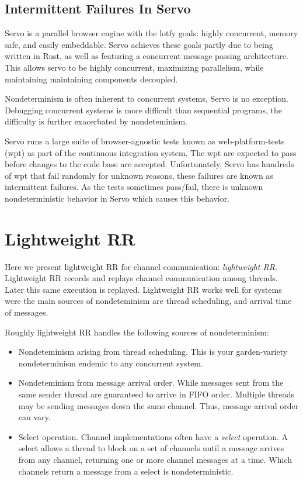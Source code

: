 \documentclass{article}
\begin{document}
\subsection{Intermittent Failures In Servo}
Servo is a parallel browser engine with the lotfy goals: highly concurrent,
memory safe, and easily embeddable. Servo achieves these goals partly due to
being written in Rust, as well as featuring a concurrent message passing
architecture. This allows servo to be highly concurrent, maximizing parallelism,
while maintaining maintaining components decoupled.

Nondeterminism is often inherent to concurrent systems, Servo is no exception.
Debugging concurrent systems is more difficult than sequential programs,
the difficulty is further exacerbated by nondeteminism.

Servo runs a large suite of browser-agnostic tests known as web-platform-tests (wpt)
as part of the continuous integration system. The wpt are expected to pass before
changes to the code base are accepted. Unfortunately, Servo has hundreds of wpt that
fail randomly for unknown reasons, these failures are known as intermittent failures.
As the tests sometimes pass/fail, there is unknown nondeterministic behavior in Servo
which causes this behavior.

\section{Lightweight RR}
Here we present lightweight RR for channel communication: \textit{lightweight RR}.
Lightweight RR records and replays channel communication among threads. Later
this same execution is replayed. Lightweight RR works well for systems were the
main sources of nondeteminism are thread scheduling, and arrival time of messages.

Roughly lightweight RR handles the following sources of nondeterminism:
\begin{itemize}
\item Nondeteminism arising from thread scheduling. This is your garden-variety nondeterminism
  endemic to any concurrent system.
\item Nondeteminism from message arrival order. While messages sent from the same sender thread are guaranteed to arrive in FIFO order. Multiple threads may be sending messages down the same channel. Thus, message arrival order can vary.
\item Select operation. Channel implementations often have a \textit{select} operation. A select allows a thread to block on a set of channels until a message arrives from any channel, returning one or more channel messages at a time. Which channels return a message from a select is nondeterministic.
\end{itemize}
\end{document}
